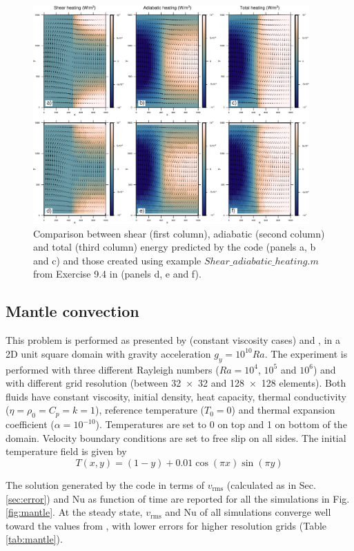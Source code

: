 \documentclass[hidelinks,10pt,a4paper]{article}
\begin{document}
\begin{figure}
\centering
\noindent\includegraphics[width=400px]{./Figures/Energy.pdf}
\caption{Comparison between shear (first column), adiabatic (second column) and total (third column) energy predicted by the code (panels a, b and c) and those
created using example ${Shear\_adiabatic\_heating.m}$ from Exercise 9.4 in \citet{Gerya2010b} (panels d, e and f).}
\label{fig:energy}
\end{figure}

\subsection{Mantle convection}\label{sec:mantle}
This problem is performed as presented by \citet{Blankenbach1989} (constant viscosity cases) and \citet{Thieulot2014}, in a 2D unit square domain with gravity
acceleration $g_y=10^{10}Ra$. The experiment is performed with three different Rayleigh numbers ($Ra=10^4$, $10^5$ and $10^6$) and with different grid
resolution (between \num{32x32} and \num{128x128} elements). Both fluids have constant viscosity, initial density, heat capacity, thermal conductivity
($\eta= \rho_0= C_p = k=1$), reference temperature ($T_0=0$) and thermal expansion coefficient ($\alpha=10^{-10}$). Temperatures are set to 0 on top and 1 on
bottom of the domain. Velocity boundary conditions are set to free slip on all sides. The initial temperature field is given by
\[T(x,y)=(1-y)+0.01 \cos (\pi x) \sin (\pi y)\]

The solution generated by the code in terms of $v_{\textrm{rms}}$ (calculated as in Sec. \ref{sec:error}) and Nu as function of time are reported for all the
simulations in Fig. \ref{fig:mantle}. At the steady state, $v_{\textrm{rms}}$ and Nu of all simulations converge well toward the values from \citet{Blankenbach1989},
with lower errors for higher resolution grids (Table \ref{tab:mantle}).
\end{document}
